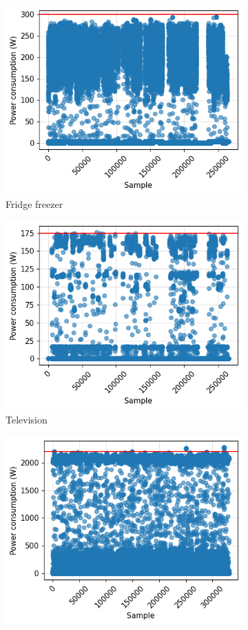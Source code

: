 \begin{figure}
\begin{subfigure}{.5\textwidth}
    \includegraphics[width=.9\linewidth]{images/raw_consumptions/fridge.png}
    \caption{Fridge freezer}%
    \label{fig:fridge_freezer}
  \end{subfigure}%
  \begin{subfigure}{.5\textwidth}
    \centering
    \includegraphics[width=.9\linewidth]{images/raw_consumptions/television.png}
    \caption{Television}%
    \label{fig:television}
  \end{subfigure}
  \begin{subfigure}{.5\textwidth}
    \centering
    \includegraphics[width=.9\linewidth]{images/raw_consumptions/microwave.png}

\end{subfigure}
\end{figure}
